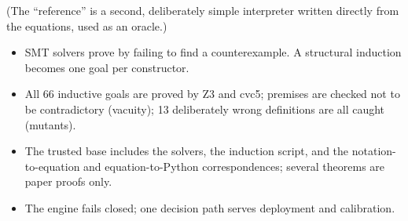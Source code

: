 (The ``reference'' is a second, deliberately simple interpreter written directly from the equations, used as an oracle.)


\begin{recap}
\begin{itemize}
\item SMT solvers prove by failing to find a counterexample. A structural induction becomes one goal per constructor.
\item All 66 inductive goals are proved by Z3 and cvc5; premises are checked not to be contradictory (vacuity); 13 deliberately wrong definitions are all caught (mutants).
\item The trusted base includes the solvers, the induction script, and the notation-to-equation and equation-to-Python correspondences; several theorems are paper proofs only.
\item The engine fails closed; one decision path serves deployment and calibration.
\end{itemize}
\end{recap}
